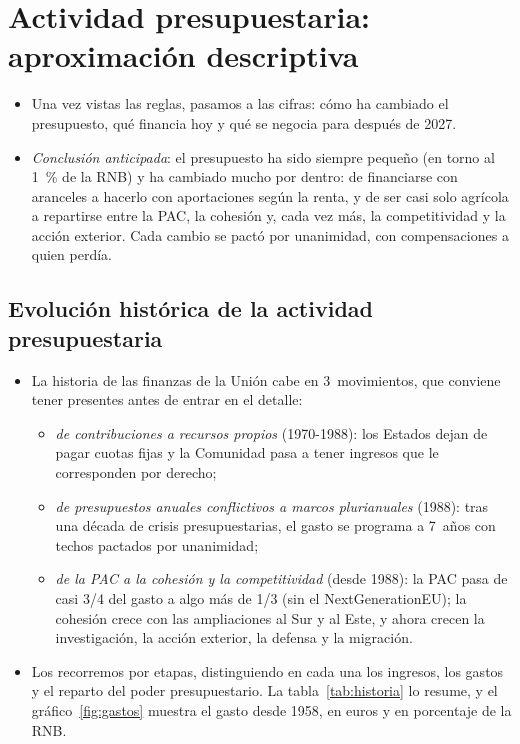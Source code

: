 \documentclass[11pt]{article}
\begin{document}
\section{Actividad presupuestaria: aproximación descriptiva}\label{sec:descriptiva}

\begin{itemize}
\item Una vez vistas las reglas, pasamos a las cifras: cómo ha cambiado el presupuesto, qué financia hoy y qué se negocia para después de 2027.
\item \emph{Conclusión anticipada}: el presupuesto ha sido siempre pequeño (en torno al 1~\% de la RNB) y ha cambiado mucho por dentro: de financiarse con aranceles a hacerlo con aportaciones según la renta, y de ser casi solo agrícola a repartirse entre la PAC, la cohesión y, cada vez más, la competitividad y la acción exterior. Cada cambio se pactó por unanimidad, con compensaciones a quien perdía.
\end{itemize}

\subsection{Evolución histórica de la actividad presupuestaria}\label{sec:historia}

\begin{itemize}
\item La historia de las finanzas de la Unión cabe en 3~movimientos, que conviene tener presentes antes de entrar en el detalle:
  \begin{itemize}
  \item \emph{de contribuciones a recursos propios} (1970-1988): los Estados dejan de pagar cuotas fijas y la Comunidad pasa a tener ingresos que le corresponden por derecho;
  \item \emph{de presupuestos anuales conflictivos a marcos plurianuales} (1988): tras una década de crisis presupuestarias, el gasto se programa a 7~años con techos pactados por unanimidad;
  \item \emph{de la PAC a la cohesión y la competitividad} (desde 1988): la PAC pasa de casi 3/4 del gasto a algo más de 1/3 (sin el NextGenerationEU); la cohesión crece con las ampliaciones al Sur y al Este, y ahora crecen la investigación, la acción exterior, la defensa y la migración.
  \end{itemize}
\item Los recorremos por etapas, distinguiendo en cada una los ingresos, los gastos y el reparto del poder presupuestario. La tabla~\ref{tab:historia} lo resume, y el gráfico~\ref{fig:gastos} muestra el gasto desde 1958, en euros y en porcentaje de la RNB\nocite{CE2009InformeFinanciero,CE2014Finance,PE2026FichaHistoria}.
\end{itemize}
\end{document}

